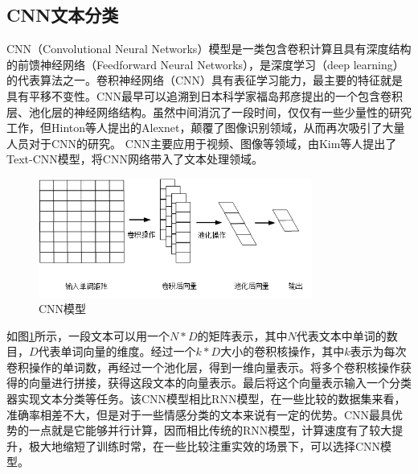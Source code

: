 \subsection{CNN文本分类}
CNN（Convolutional Neural Networks）模型是一类包含卷积计算且具有深度结构的前馈神经网络（Feedforward Neural Networks），是深度学习（deep learning）的代表算法之一。卷积神经网络（CNN）具有表征学习能力，最主要的特征就是具有平移不变性。CNN最早可以追溯到日本科学家福岛邦彦提出的一个包含卷积层、池化层的神经网络结构。虽然中间消沉了一段时间，仅仅有一些少量性的研究工作，但Hinton等人提出的Alexnet，颠覆了图像识别领域，从而再次吸引了大量人员对于CNN的研究。
CNN主要应用于视频、图像等领域，由Kim等人提出了Text-CNN模型，将CNN网络带入了文本处理领域。
\begin{figure}[htb]%
	\setlength{\belowcaptionskip}{0pt}
	\centering
	\includegraphics[width=0.8\textwidth]{pic/2-13.png}
	\caption{CNN模型}
	\label{cnn}
\end{figure}

如图\ref{cnn}所示，一段文本可以用一个$N\ast D$的矩阵表示，其中$N$代表文本中单词的数目，$D$代表单词向量的维度。经过一个$k\ast D$大小的卷积核操作，其中$k$表示为每次卷积操作的单词数，再经过一个池化层，得到一维向量表示。将多个卷积核操作获得的向量进行拼接，获得这段文本的向量表示。最后将这个向量表示输入一个分类器实现文本分类等任务。该CNN模型相比RNN模型，在一些比较的数据集来看，准确率相差不大，但是对于一些情感分类的文本来说有一定的优势。CNN最具优势的一点就是它能够并行计算，因而相比传统的RNN模型，计算速度有了较大提升，极大地缩短了训练时常，在一些比较注重实效的场景下，可以选择CNN模型。

